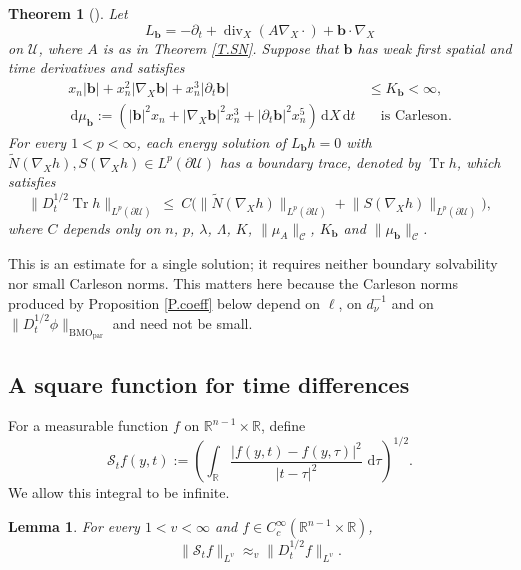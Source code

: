 \documentclass[10pt,a4paper]{amsart}
\numberwithin{equation}{section}
\DeclareMathOperator{\divg}{div}
\newcommand{\R}{\mathbb R}
\newcommand{\abs}[1]{\left\vert#1\right\vert}
\newcommand{\br}[1]{\left(#1\right)}
\newcommand{\pd}{\partial}
\newcommand{\dhalf}{D_t^{1/2}}
\newcommand{\BMOpar}{\mathrm{BMO}_{\mathrm{par}}}
\newcommand{\Uc}{\mathcal U}
\newcommand{\Cc}{\mathcal C}
\newcommand{\Nt}{\widetilde N}
\renewcommand{\d}{\,\mathrm d}
\newcommand{\Cnorm}[1]{\|#1\|_{\Cc}}
\newtheorem{theorem}[equation]{Theorem}
\newtheorem{lemma}[equation]{Lemma}
\begin{document}
\begin{theorem}[{\cite[Theorem 1.7]{DLPN}}]\label{T.half}
Let
$$L_{\mathbf b}=-\pd_t+\divg_X(A\nabla_X\cdot)
  +\mathbf b\cdot\nabla_X$$
on $\Uc$, where $A$ is as in Theorem \ref{T.SN}. Suppose that $\mathbf b$
has weak first spatial and time derivatives and satisfies
\begin{equation}\label{E.ghyp}
 \begin{aligned}
  x_n\abs{\mathbf b}+x_n^2\abs{\nabla_X\mathbf b}
  +x_n^3\abs{\pd_t\mathbf b}&\le K_{\mathbf b}<\infty,\\
  \d\mu_{\mathbf b}:=
  \br{\abs{\mathbf b}^2x_n+\abs{\nabla_X\mathbf b}^2x_n^3
  +\abs{\pd_t\mathbf b}^2x_n^5}\d X\d t
  &\quad\text{is Carleson}.
 \end{aligned}
\end{equation}
For every $1<p<\infty$, each energy solution of $L_{\mathbf b}h=0$ with
$\Nt(\nabla_Xh),S(\nabla_Xh)\in L^p(\pd\Uc)$ has a boundary trace,
denoted by $\operatorname{Tr}h$, which satisfies
\begin{equation}\label{E.target}
  \big\|\dhalf\operatorname{Tr}h\big\|_{L^p(\pd\Uc)}\ \le\
  C\Big(\big\|\Nt(\nabla_Xh)\big\|_{L^p(\pd\Uc)}
   +\big\|S(\nabla_Xh)\big\|_{L^p(\pd\Uc)}\Big),
\end{equation}
where $C$ depends only on $n$, $p$, $\lambda$, $\Lambda$, $K$,
$\Cnorm{\mu_A}$, $K_{\mathbf b}$ and $\Cnorm{\mu_{\mathbf b}}$.
\end{theorem}

\noindent This is an estimate for a single solution; it requires neither
boundary solvability nor small Carleson norms. This matters here because the
Carleson norms produced by Proposition \ref{P.coeff} below depend on $\ell$,
on $d_\nu^{-1}$ and on $\|\dhalf\phi\|_{\BMOpar}$ and need not be small.

\subsection{A square function for time differences}\label{ss.timesquare}

For a measurable function $f$ on $\R^{n-1}\times\R$, define
\begin{equation}\label{E.timesquaredef}
 \mathcal S_t f(y,t):=
 \left(\int_\R\frac{|f(y,t)-f(y,\tau)|^2}{|t-\tau|^2}\,\d\tau\right)^{1/2}.
\end{equation}
We allow this integral to be infinite.

\begin{lemma}\label{L.timesquare}
For every $1<v<\infty$ and $f\in C_c^\infty(\R^{n-1}\times\R)$,
\begin{equation}\label{E.timesquare}
 \|\mathcal S_t f\|_{L^v}\approx_v\|\dhalf f\|_{L^v}.
\end{equation}
\end{lemma}
\end{document}
